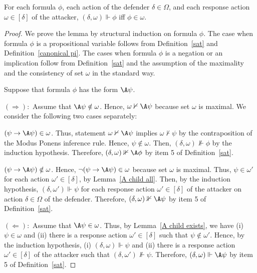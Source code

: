 \documentclass[letterpaper]{article}
\begin{document}
\begin{lemma}\label{truth lemma}
For each formula $\phi$, each action of the defender $\delta\in\Omega$, and each response action $\omega \in [\delta]$ of the attacker,
$(\delta,\omega)\Vdash\phi$ iff $\phi\in\omega$.

\end{lemma}
\begin{proof}
We prove the lemma by structural induction on formula $\phi$. The case when formula $\phi$ is a propositional variable follows from Definition~\ref{sat} and Definition~\ref{canonical pi}. The cases when formula $\phi$ is a negation or an implication follow from Definition~\ref{sat} and the assumption of the maximality and the consistency of set $\omega$ in the standard way.

\vspace{2mm}
Suppose that formula $\phi$ has the form $\A\psi$.

\noindent$(\Rightarrow):$ Assume that $\A\psi\notin\omega$. Hence, $\omega\nvdash\A\psi$ because set $\omega$ is maximal. We consider the following two cases separately:

 $(\psi\to\A\psi)\in \omega$. Thus, statement $\omega\nvdash\A\psi$ implies $\omega\nvdash\psi$ by the contraposition of the Modus Ponens inference rule. Hence, $\psi\not\in \omega$. Then, $(\delta,\omega)\nVdash\phi$ by the induction hypothesis. Therefore, $(\delta,\omega)\nVdash\A\phi$ by item 5 of Definition~\ref{sat}.

 $(\psi\to\A\psi)\notin \omega$. Hence, $\neg(\psi\to\A\psi)\in \omega$ because set $\omega$ is maximal. Thus, $\psi\in\omega'$ for each action $\omega'\in [\delta]$, by Lemma~\ref{A child all}. Then, by the induction hypothesis, $(\delta,\omega')\Vdash\psi$ for each response action $\omega'\in[\delta]$ of the attacker on action $\delta\in\Omega$ of the defender. Therefore, $(\delta,\omega)\nVdash\A\psi$ by item 5 of  Definition~\ref{sat}.   

\noindent$(\Leftarrow):$ Assume that $\A\psi\in\omega$. Thus, by Lemma~\ref{A child exists}, we have
(i) $\psi\in\omega$ and
(ii) there is a response action $\omega'\in[\delta]$ such that $\psi\notin\omega'$.  Hence, by the induction hypothesis, 
(i) $(\delta,\omega)\Vdash\psi$ and
(ii) there is a response action $\omega'\in[\delta]$ of the attacker such that $(\delta,\omega')\nVdash \psi$. Therefore, $(\delta,\omega)\Vdash\A\psi$ by item 5 of Definition~\ref{sat}.


\end{proof}
\end{document}
